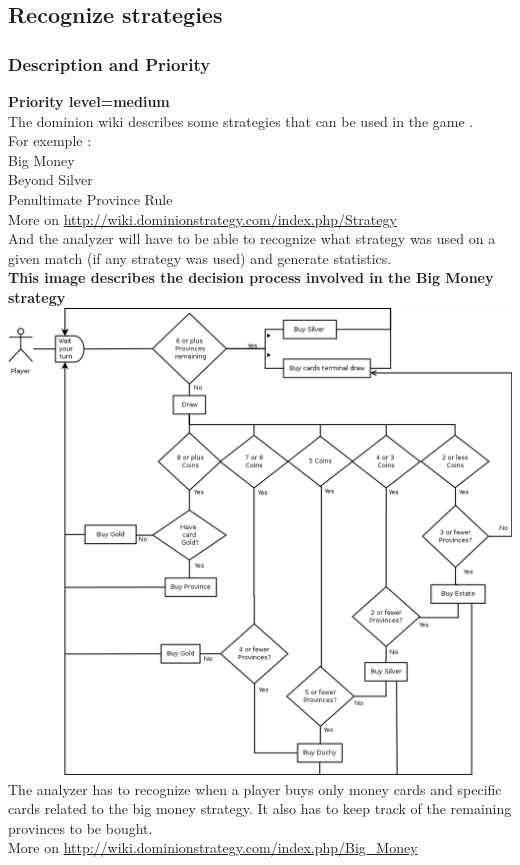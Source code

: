 \documentclass{scrreprt}
\begin{document}
\subsection{Recognize strategies}
\subsubsection{Description and Priority}
\textbf{Priority level=medium}\\
The dominion wiki describes some strategies that can be used in the game .\\ For exemple :\\
Big Money\\
Beyond Silver \\
Penultimate Province Rule \\
More on \url{http://wiki.dominionstrategy.com/index.php/Strategy}\\

And the analyzer will have to be able to recognize what strategy was used on a
given match (if any strategy was used) and generate statistics.\\
\textbf{This image describes the decision process involved in the Big Money strategy}\\
\includegraphics[width=\textwidth,height=\textheight,keepaspectratio]{big-money}\\
The analyzer has to recognize when a player buys only money cards and specific cards related to the big money strategy. It also has to keep track of the remaining provinces to be bought.\\
More on \url{http://wiki.dominionstrategy.com/index.php/Big_Money}\\
\end{document}
